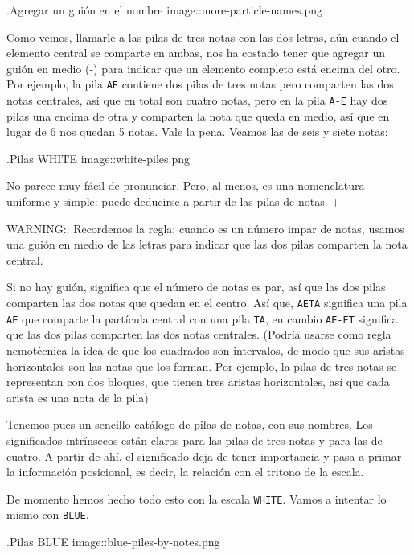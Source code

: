\documentclass[]{article}
\begin{document}
.Agregar un guión en el nombre image::more-particle-names.png

Como vemos, llamarle a las pilas de tres notas con las dos letras, aún cuando el elemento central se comparte en ambas, nos ha costado tener que agregar un guión en medio (-) para indicar que un elemento completo está encima del otro. Por ejemplo, la pila \texttt{AE} contiene dos pilas de tres notas pero comparten las dos notas centrales, así que en total son cuatro notas, pero en la pila \texttt{A-E} hay dos pilas una encima de otra y comparten la nota que queda en medio, así que en lugar de 6 nos quedan 5 notas. Vale la pena. Veamos las de seis y siete notas:

.Pilas WHITE image::white-piles.png

No parece muy fácil de pronunciar. Pero, al menos, es una nomenclatura uniforme y simple: puede deducirse a partir de las pilas de notas. +

WARNING:: Recordemos la regla: cuando es un número impar de notas, usamos una guión en medio de las letras para indicar que las dos pilas comparten la nota central.

Si no hay guión, significa que el número de notas es par, así que las dos pilas comparten las dos notas que quedan en el centro. Así que, \texttt{AETA} significa una pila \texttt{AE} que comparte la partícula central con una pila \texttt{TA}, en cambio \texttt{AE-ET} significa que las dos pilas comparten las dos notas centrales. (Podría usarse como regla nemotécnica la idea de que los cuadrados son intervalos, de modo que sus aristas horizontales son las notas que los forman. Por ejemplo, la pilas de tres notas se representan con dos bloques, que tienen tres aristas horizontales, así que cada arista es una nota de la pila)

Tenemos pues un sencillo catálogo de pilas de notas, con sus nombres. Los significados intrínsecos están claros para las pilas de tres notas y para las de cuatro. A partir de ahí, el significado deja de tener importancia y pasa a primar la información posicional, es decir, la relación con el tritono de la escala.

De momento hemos hecho todo esto con la escala \texttt{WHITE}. Vamos a intentar lo mismo con \texttt{BLUE}.

.Pilas BLUE image::blue-piles-by-notes.png
\end{document}
